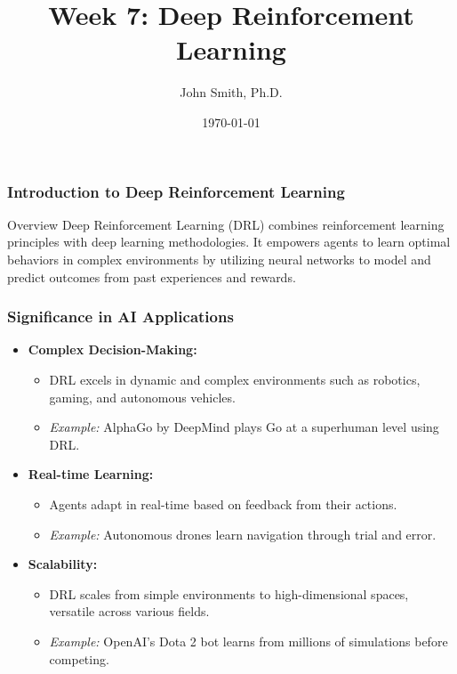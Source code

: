 \documentclass[aspectratio=169]{beamer}
\title[Deep Reinforcement Learning]{Week 7: Deep Reinforcement Learning}
\author[J. Smith]{John Smith, Ph.D.}
\institute[University Name]{
  Department of Computer Science\\
  University Name\\
  \vspace{0.3cm}
  Email: email@university.edu\\
  Website: www.university.edu
}
\date{\today}
\begin{document}
\frame{\titlepage}

\begin{frame}[fragile]
    \frametitle{Introduction to Deep Reinforcement Learning}
    \begin{block}{Overview}
        Deep Reinforcement Learning (DRL) combines reinforcement learning principles with deep learning methodologies. It empowers agents to learn optimal behaviors in complex environments by utilizing neural networks to model and predict outcomes from past experiences and rewards.
    \end{block}
\end{frame}

\begin{frame}[fragile]
    \frametitle{Significance in AI Applications}
    \begin{itemize}
        \item \textbf{Complex Decision-Making:}
            \begin{itemize}
                \item DRL excels in dynamic and complex environments such as robotics, gaming, and autonomous vehicles.
                \item \textit{Example:} AlphaGo by DeepMind plays Go at a superhuman level using DRL.
            \end{itemize}
        
        \item \textbf{Real-time Learning:}
            \begin{itemize}
                \item Agents adapt in real-time based on feedback from their actions.
                \item \textit{Example:} Autonomous drones learn navigation through trial and error.
            \end{itemize}
        
        \item \textbf{Scalability:}
            \begin{itemize}
                \item DRL scales from simple environments to high-dimensional spaces, versatile across various fields.
                \item \textit{Example:} OpenAI's Dota 2 bot learns from millions of simulations before competing.
            \end{itemize}
    \end{itemize}
\end{frame}
\end{document}
